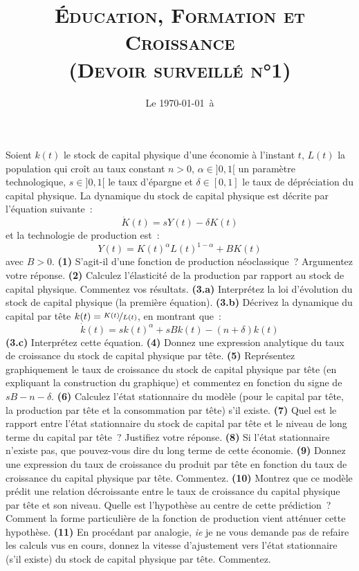 \documentclass[10pt,a4paper,notitlepage]{article}
\newcommand{\question}[1]{\textbf{(#1)}}
\begin{document}
\title{\textsc{Éducation, Formation et Croissance\\ \small{(Devoir surveillé n°1)}}}
\date{Le \today\ à \thistime}

\maketitle

Soient $k(t)$ le stock de capital physique d'une économie à l'instant
$t$, $L(t)$ la population qui croît au taux constant $n>0$,
$\alpha\in]0,1[$ un paramètre technologique, $s\in]0,1[$ le taux
d'épargne et $\delta\in[0,1]$ le taux de dépréciation du capital
physique. La dynamique du stock de capital physique est décrite par
l'équation suivante :
\[
\dot K(t) = sY(t)-\delta K(t)
\]
et la technologie de production est :
\[
Y(t) = K(t)^\alpha L(t)^{1-\alpha} + BK(t)
\]
avec $B>0$. \question{1} S'agit-il d'une fonction de production
néoclassique ? Argumentez votre réponse. \question{2} Calculez
l'élasticité de la production par rapport au stock de capital
physique. Commentez vos résultats. \question{3.a}
Interprétez la loi d'évolution du stock de capital physique (la
première équation). \question{3.b} Décrivez la dynamique du capital
par tête $k(t)=\nicefrac{K(t)}{L(t)}$, en montrant que :
\[
\dot k(t) = sk(t)^{\alpha}+sBk(t)-(n+\delta)k(t)
\]
\question{3.c} Interprétez cette équation. \question{4} Donnez une
expression analytique du taux de croissance du stock de capital
physique par tête. \question{5} Représentez graphiquement le taux de
croissance du stock de capital physique par tête (en expliquant la
construction du graphique) et commentez en fonction du signe de
$sB-n-\delta$. \question{6} Calculez l'état stationnaire du modèle
(pour le capital par tête, la production par tête et la consommation
par tête) s'il existe. \question{7} Quel est le rapport entre l'état
stationnaire du stock de capital par tête et le niveau de long terme
du capital par tête ? Justifiez votre réponse. \question{8} Si l'état
stationnaire n'existe pas, que pouvez-vous dire du long terme de cette
économie. \question{9} Donnez une expression du taux de croissance du
produit par tête en fonction du taux de croissance du capital physique
par tête. Commentez. \question{10} Montrez
que ce modèle prédit une relation décroissante entre le taux de
croissance du capital physique par tête et son niveau. Quelle est
l'hypothèse au centre de cette prédiction ? Comment la forme
particulière de la fonction de production vient atténuer cette
hypothèse. \question{11} En procédant par analogie, \emph{ie} je ne
vous demande pas de refaire les calculs vus en cours, donnez la
vitesse d'ajustement vers l'état stationnaire (s'il existe) du stock
de capital physique par tête. Commentez.
\end{document}
